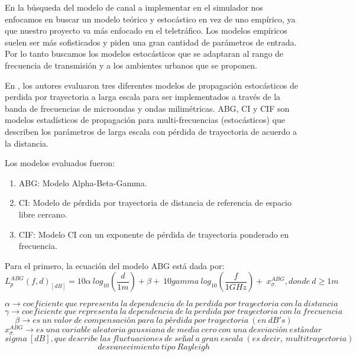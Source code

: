 En la búsqueda del modelo de canal a implementar en el simulador nos enfocamos en buscar un modelo teórico y estocástico en vez de uno empírico, ya que nuestro proyecto va más enfocado en el teletráfico. Los modelos empíricos suelen ser más sofisticados y piden una gran cantidad de parámetros de entrada. Por lo tanto buscamos los modelos estocásticos que se adaptaran al rango de frecuencia de transmisión y a los ambientes urbanos que se proponen.\newline

En \parencite{Sun2016}, los autores evaluaron tres diferentes modelos de propagación estocásticos de perdida por trayectoria a larga escala para ser implementados a través de la banda de frecuencias de microondas y ondas milimétricas. ABG, CI y CIF son modelos estadísticos de propagación para multi-frecuencias (estocásticos) que describen los parámetros de larga escala con pérdida de trayectoria de acuerdo a la distancia.

Los modelos evaluados fueron: 
\begin{enumerate}
\item  ABG: Modelo Alpha-Beta-Gamma.
\item  CI: Modelo de pérdida por trayectoria de distancia de referencia de espacio libre cercano.
\item  CIF: Modelo CI con un exponente de pérdida de trayectoria ponderado en frecuencia.
\end{enumerate}

 Para el primero, la ecuación del modelo ABG está dada por:
 \begin{equation}
    L^{ABG}_p(f,d)_{\left[dB\right]}=10 \alpha {\ log}_{10}\left(\frac{d}{1m}\right)+\beta +\ 10gamma {\ log}_{10}\left(\frac{f}{1GHz}\right)+\ x^{ABG}_{\sigma .}, donde\ d\ge 1m
    \label{eqn:ABG}
\end{equation}

\[\alpha \to coeficiente\ que\ representa\ la\ dependencia\ de\ la\ perdida\ por\ trayectoria\ con\ la\ distancia\] 
\[\gamma \to coeficiente\ que\ representa\ la\ dependencia\ de\ la\ perdida\ por\ trayectoria\ con\ la\ frecuencia\] 
\[\beta \to es\ un\ valor\ de\ compensación\ para\ la\ pérdida\ por\ trayectoria\ (en\ dB's)\] 
\[x^{ABG}_{\sigma .}\to es\ una\ variable\ aleatoria\ gaussiana\ de\ media\ cero\ con\ una\ desviaci\textrm{ó}n\ est\textrm{á}ndar \]
\[sigma \ [dB], que\ describe\ las\ fluctuaciones\ de\ se\textrm{ñ}al\ a\ gran\ escala\ (es\ decir,\ multitrayectoria)\]
\[desvanecimiento\ tipo\ Rayleigh \] 

